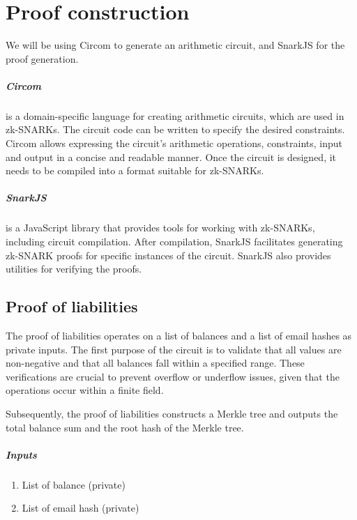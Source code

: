 

\chapter{Proof construction}
We will be using Circom to generate an arithmetic circuit, and SnarkJS for the proof generation.


\paragraph{Circom} is a domain-specific language for creating arithmetic circuits, which are used in zk-SNARKs.
The circuit code can be written to specify the desired constraints.
Circom allows expressing the circuit's arithmetic operations, constraints, input and output in a concise and readable manner.
Once the circuit is designed, it needs to be compiled into a format suitable for zk-SNARKs.




\paragraph{SnarkJS} is a JavaScript library that provides tools for working with zk-SNARKs, including circuit compilation.
After compilation, SnarkJS facilitates generating zk-SNARK proofs for specific instances of the circuit.
SnarkJS also provides utilities for verifying the proofs.


\section{Proof of liabilities}
\label{subsec:pl}
The proof of liabilities operates on a list of balances and a list of email hashes as private inputs.
The first purpose of the circuit is to validate that all values are non-negative and that all balances fall within a specified range.
These verifications are crucial to prevent overflow or underflow issues, given that the operations occur within a finite field.


Subsequently, the proof of liabilities constructs a Merkle tree and outputs the total balance sum and the root hash of the Merkle tree.


\paragraph{Inputs}
\begin{enumerate}


   \item List of balance (private)
  
   \item List of email hash (private)
  
   \end{enumerate}


